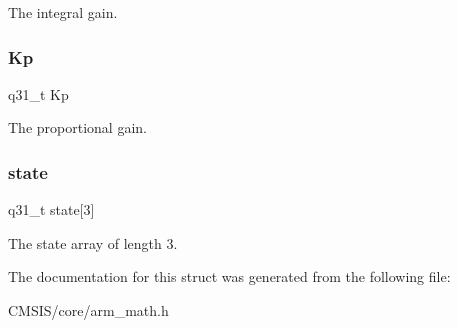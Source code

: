 The integral gain. \mbox{\label{structarm__pid__instance__q31_a6ec4b37fe2246a7e017dd07578fe5bbd}} 
\subsubsection{\texorpdfstring{Kp}{Kp}}
{\footnotesize\ttfamily q31\+\_\+t Kp}

The proportional gain. \mbox{\label{structarm__pid__instance__q31_af0a2da4da9a94af652873ec7e7be4880}} 
\subsubsection{\texorpdfstring{state}{state}}
{\footnotesize\ttfamily q31\+\_\+t state\mbox{[}3\mbox{]}}

The state array of length 3. 

The documentation for this struct was generated from the following file\+:\begin{DoxyCompactItemize}
\item 
C\+M\+S\+I\+S/core/arm\+\_\+math.\+h\end{DoxyCompactItemize}
